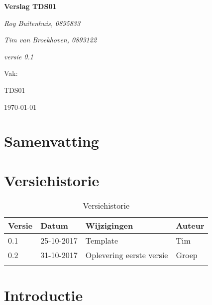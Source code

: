 \documentclass[11pt,a4paper]{article}
\def\auteureen{Roy Buitenhuis, 0895833}
\def\auteurtwee{Tim van Broekhoven, 0893122}
\def\titel{Verslag TDS01}
\def\datum{\today}
\def\versie{0.1}
\begin{document}
	
	\begin{titlepage}
		
		\centering
		{\huge\bfseries \titel \par}
		
		\vspace{1cm}
		{\Large\itshape \auteureen \par}
		{\Large\itshape \auteurtwee \par}
		\vspace{1cm}
		{\Large\itshape versie \versie\par}
				
		\vfill
		Vak:\par
		TDS01
		
		\vfill
		{\large \datum \par}
	\end{titlepage}

	\section{Samenvatting}
	
	\clearpage
	
	\tableofcontents
	
	\clearpage
	
	\listoffigures
	
	\clearpage
	\listoftables
	
	\clearpage
	
	\section{Versiehistorie}
	\begin{table}[H]
		\centering
		\label{Versiehistorie}
		\begin{tabular}{|p{1cm}|p{2cm}|p{6cm}|p{2cm}|}
			\hline
			\rowcolor[HTML]{FFCC67}
			\textbf{Versie} & \textbf{Datum} & \textbf{Wijzigingen} & \textbf{Auteur} \\ \hline
			0.1    & 25-10-2017 & Template    & Tim \\ \hline
			0.2	   & 31-10-2017 & Oplevering eerste versie  & Groep \\ \hline
			&       &             &        \\ \hline
		\end{tabular}
		\caption {Versiehistorie} \label{tab:title} 
	\end{table}	


	\section{Introductie}
\end{document}
